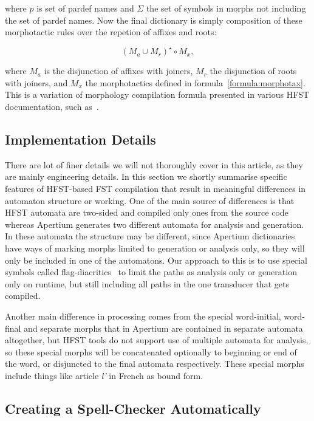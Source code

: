 \documentclass[10pt,a4paper]{article}
\begin{document}
where $p$ is set of pardef names and $\Sigma$ the set
of symbols in morphs not including the set of pardef names.  Now the final
dictionary is simply composition of these morphotactic rules over the repetion
of affixes and roots:

\begin{equation}\label{formula:lexical}
(M_a \cup M_r)^{\star} \circ M_x,
\end{equation}

where $M_{a}$ is the disjunction of affixes with joiners, $M_{r}$ the
disjunction of roots with joiners, and $M_x$ the morphotactics defined in
formula~\ref{formula:morphotax}. This is a variation of morphology compilation
formula presented in various HFST documentation, such as~\cite{hfst/2011}.

\subsection{Implementation Details}

There are lot of finer details we will not thoroughly cover in this article, as
they are mainly engineering details. In this section we shortly summarise
specific features of HFST-based FST compilation that result in meaningful
differences in automaton structure or working. One of the main source of
differences is that HFST automata are two-sided and compiled only ones from the
source code whereas Apertium generates two different automata for analysis and
generation. In these automata the structure may be different, since Apertium
dictionaries have ways of marking morphs limited to generation or analysis
only, so they will only be included in one of the automatons. Our approach to
this is to use special symbols called flag-diacritics~\cite{beesley/2003} to
limit the paths as analysis only or generation only on runtime, but still
including all paths in the one transducer that gets compiled.

Another main difference in processing comes from the special word-initial, 
word-final and separate morphs that in Apertium are contained in separate
automata altogether, but HFST tools do not support use of multiple automata
for analysis, so these special morphs will be concatenated optionally to
beginning or end of the word, or disjuncted to the final automata respectively.
These special morphs include things like article \emph{l'} in French as bound
form.

\subsection{Creating a Spell-Checker Automatically}
\end{document}

